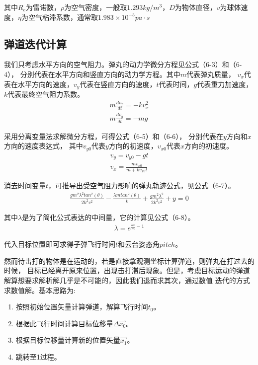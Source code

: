 其中$R_e$为雷诺数，$\rho$为空气密度，一般取$1.293kg/m^3$，$D$为物体直径，$v$为球体速度，$\eta$为空气粘滞系数，通常取$1.983\times10^{-5}pa\cdot s$


\subsection{弹道迭代计算}

我们只考虑水平方向的空气阻力。弹丸的动力学微分方程见公式（6-3）和（6-4），
分别代表在水平方向和竖直方向的动力学方程。其中$m$代表弹丸质量，
$v_x$代表在水平方向的速度，$v_y$代表在竖直方向的速度，$t$代表时间，$g$代表重力加速度，$k$代表最终空气阻力系数。
\begin{gather}
    m \frac{dv_x}{dt} = -k v_x^2 \\
    m \frac{dv_y}{dt} = -mg
\end{gather} 

采用分离变量法求解微分方程，可得公式（6-5）和（6-6），
分别代表在$y$方向和$x$方向的速度表达式，
其中$v_{y0}$代表$y$方向的初速度，$v_{x0}$代表$x$方向的初速度。
\begin{gather}
    v_y = v_{y0}-gt \\
    v_x = \frac{m v_{x0}}{m+kv_{x0}t}
\end{gather}

消去时间变量$t$，可推导出受空气阻力影响的弹丸轨迹公式，见公式（6-7）。
\begin{gather}
\frac{gm^2\lambda^2 tan^2(\theta)}{2k^2v^2}-\frac{\lambda m tan^2(\theta)}{k}+\frac{gm^2\lambda^2}{2k^2v^2}+y = 0
\end{gather}

其中$\lambda$是为了简化公式表达的中间量，它的计算见公式（6-8）。
\begin{gather}
    \lambda = e^{\frac{kx}{m}-1}
\end{gather}

代入目标位置即可求得子弹飞行时间$t$和云台姿态角$pitch$。\par
然而待击打的物体是在运动的，若是直接拿观测坐标计算弹道，则弹丸在打过去的时候，
目标已经离开原来位置，出现击打滞后现象。但是，考虑目标运动的弹道解算想要求解析解几乎是不可能的，因此我们退而求其次，通过数值
迭代的方式求数值解。基本思路为:
\begin{enumerate}
    \item 按照初始位置矢量计算弹道，解算飞行时间$t_0$。
    \item 根据此飞行时间计算目标位移量$\Delta \vec{x_0}$。
    \item 根据目标位移量计算新的位置矢量$\vec{x_1}$。
    \item 跳转至1过程。
\end{enumerate}

